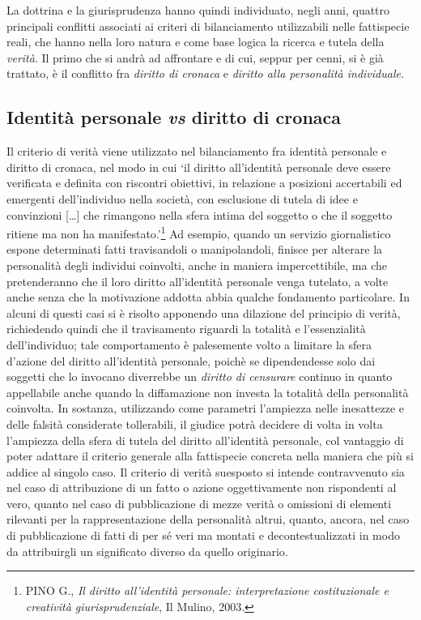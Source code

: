 La dottrina e la giurisprudenza hanno quindi individuato, negli anni, quattro principali conflitti associati ai criteri di bilanciamento utilizzabili nelle fattispecie reali, che hanno nella loro natura e come base logica la ricerca e tutela della \textit{verità}.
Il primo che si andrà ad affrontare e di cui, seppur per cenni, si è già trattato, è il conflitto fra \textit{diritto di cronaca} e \textit{diritto alla personalità individuale}.
\subsection{Identità personale \textit{vs} diritto di cronaca}
Il criterio di verità viene utilizzato nel bilanciamento fra identità personale e diritto di cronaca, nel modo in cui ‘il diritto all’identità personale deve essere verificata e definita con riscontri obiettivi, in relazione a posizioni accertabili ed emergenti dell’individuo nella società, con esclusione di tutela di idee e convinzioni […] che rimangono nella sfera intima del soggetto o che il soggetto ritiene ma non ha manifestato.’\footnote{PINO G.,\textit{ Il diritto all'identità personale: interpretazione costituzionale e creatività giurisprudenziale}, Il Mulino, 2003.}
Ad esempio, quando un servizio giornalistico espone determinati fatti travisandoli o manipolandoli, finisce per alterare la personalità degli individui coinvolti, anche in maniera impercettibile, ma che pretenderanno che il loro diritto all'identità personale venga tutelato, a volte anche senza che la motivazione addotta abbia qualche fondamento particolare. In alcuni di questi casi si è risolto apponendo una dilazione del principio di verità, richiedendo quindi che il travisamento riguardi la totalità e l’essenzialità dell'individuo; tale comportamento è palesemente volto a limitare la sfera d’azione del diritto all’identità personale, poichè se dipendendesse solo dai soggetti che lo invocano diverrebbe un \textit{diritto di censurare} continuo in quanto appellabile anche quando la diffamazione non investa la totalità della personalità coinvolta.
In sostanza, utilizzando come parametri l’ampiezza nelle inesattezze e delle falsità considerate tollerabili, il giudice potrà decidere di volta in volta l’ampiezza della sfera di tutela del diritto all’identità personale, col vantaggio di poter adattare il criterio generale alla fattispecie concreta nella maniera che più si addice al singolo caso.
Il criterio di verità suesposto si intende contravvenuto sia nel caso di attribuzione di un fatto o azione oggettivamente non rispondenti al vero, quanto nel caso di pubblicazione di mezze verità o omissioni di elementi rilevanti per la rappresentazione della personalità altrui, quanto, ancora, nel caso di pubblicazione di fatti di per sé veri ma montati e decontestualizzati in modo da attribuirgli un significato diverso da quello originario.
